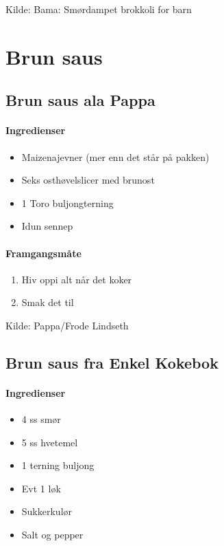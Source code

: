 \documentclass[12pt,a4paper]{book}
\begin{document}
Kilde: Bama: Smørdampet brokkoli for barn
\clearpage{}
\clearpage{}\section{Brun saus}


\subsection{Brun saus ala Pappa}

\paragraph{Ingredienser}
\begin{itemize}[noitemsep]
	\item Maizenajevner (mer enn det står på pakken)
	\item Seks osthøvelslicer med brunost
	\item 1 Toro buljongterning
	\item Idun sennep
\end{itemize}


\paragraph{Framgangsmåte}
\begin{enumerate}[noitemsep]
	\item Hiv oppi alt når det koker
	\item Smak det til
\end{enumerate}

Kilde: Pappa/Frode Lindseth


\subsection{Brun saus fra Enkel Kokebok}
\paragraph{Ingredienser}
\begin{itemize}[noitemsep]
	\item 4 ss smør
	\item 5 ss hvetemel
	\item 1 terning buljong
	\item Evt 1 løk
	\item Sukkerkulør
	\item Salt og pepper
\end{itemize}
\end{document}
